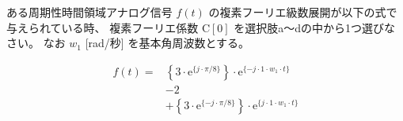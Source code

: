 ある周期性時間領域アナログ信号 $f(t)$ の複素フーリエ級数展開が以下の式で与えられている時、
複素フーリエ係数 $\textrm{C}[0]$ を選択肢a〜dの中から1つ選びなさい。
なお $w_1$ [rad/秒] を基本角周波数とする。

\begin{align*}
f(t) =
&  \left \{ 3 \cdot \textrm{e}^{\{ j \cdot \pi/8 \}} \right \} \cdot \textrm{e}^{\{-j \cdot 1 \cdot w_1 \cdot t \}} \\
&- 2 \\
&+ \left \{ 3 \cdot \textrm{e}^{\{-j \cdot \pi/8 \}} \right \} \cdot \textrm{e}^{\{ j \cdot 1 \cdot w_1 \cdot t \}} 
\end{align*}
